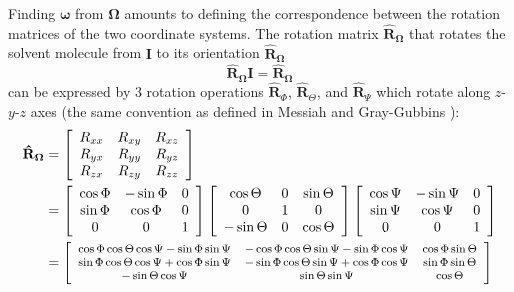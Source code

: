 Finding $\boldsymbol{\omega}$ from $\mathbf{\Omega}$ amounts to
defining the correspondence between the rotation matrices of the two
coordinate systems. The rotation matrix $\mathbf{\hat{R}}_{\mathbf{\Omega}}$
that rotates the solvent molecule from $\mathbf{I}$ to its orientation
$\mathbf{\hat{R}}_{\mathbf{\Omega}}$
\begin{equation}
\mathbf{\hat{R}}_{\mathbf{\Omega}}\mathbf{I}=\mathbf{\hat{R}}_{\mathbf{\Omega}}
\end{equation}
can be expressed by 3 rotation operations $\mathbf{\hat{R}}_{\Phi}$,
$\mathbf{\hat{R}}_{\Theta}$, and $\mathbf{\hat{R}}_{\Psi}$ which
rotate along $z$-$y$-$z$ axes (the same convention as defined in
Messiah \citep{Messiah} and Gray-Gubbins \citep{Gray-Gubbins}):
\begin{align}
\mathbf{\hat{R}}_{\mathbf{\Omega}} & =\left[\begin{array}{ccc}
R_{xx} & R_{xy} & R_{xz}\\
R_{yx} & R_{yy} & R_{yz}\\
R_{zx} & R_{zy} & R_{zz}
\end{array}\right]\\
 & =\left[\begin{array}{ccc}
\cos\Phi & -\sin\Phi & 0\\
\sin\Phi & \cos\Phi & 0\\
0 & 0 & 1
\end{array}\right]\left[\begin{array}{ccc}
\cos\Theta & 0 & \sin\Theta\\
0 & 1 & 0\\
-\sin\Theta & 0 & \cos\Theta
\end{array}\right]\left[\begin{array}{ccc}
\cos\Psi & -\sin\Psi & 0\\
\sin\Psi & \cos\Psi & 0\\
0 & 0 & 1
\end{array}\right]\nonumber \\
 & =\footnotesize\left[\begin{array}{ccc}
\cos\Phi\cos\Theta\cos\Psi-\sin\Phi\sin\Psi & -\cos\Phi\cos\Theta\sin\Psi-\sin\Phi\cos\Psi & \cos\Phi\sin\Theta\\
\sin\Phi\cos\Theta\cos\Psi+\cos\Phi\sin\Psi & -\sin\Phi\cos\Theta\sin\Psi+\cos\Phi\cos\Psi & \sin\Phi\sin\Theta\\
-\sin\Theta\cos\Psi & \sin\Theta\sin\Psi & \cos\Theta
\end{array}\right]\nonumber 
\end{align}
